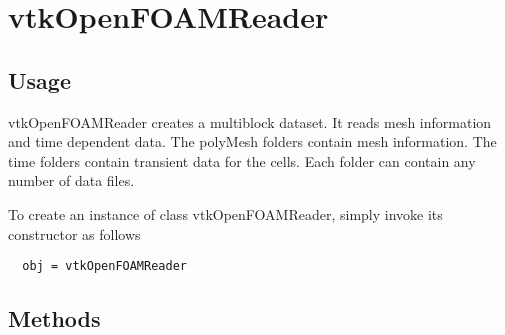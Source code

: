 \section{vtkOpenFOAMReader}

\subsection{Usage}

 vtkOpenFOAMReader creates a multiblock dataset. It reads mesh
 information and time dependent data.  The polyMesh folders contain
 mesh information. The time folders contain transient data for the
 cells. Each folder can contain any number of data files.

To create an instance of class vtkOpenFOAMReader, simply
invoke its constructor as follows
\begin{verbatim}
  obj = vtkOpenFOAMReader
\end{verbatim}
\subsection{Methods}


